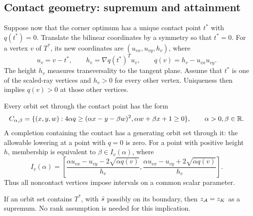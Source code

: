 \subsection{Contact geometry: supremum and attainment}

Suppose now that the corner optimum has a unique contact point $t^*$ with
$q(t^*)=0$. Translate the bilinear coordinates by a symmetry so that
$t^*=0$. For a vertex $v$ of $T^*$, its new coordinates are
$(u_{vx},u_{vy},h_v)$, where
\[
 u_v=v-t^*,\qquad h_v=\nabla q(t^*)^Tu_v,
 \qquad q(v)=h_v-u_{vx}u_{vy}.
\]
The height $h_v$ measures transversality to the tangent plane. Assume that
$t^*$ is one of the scaled-ray vertices and $h_v>0$ for every other vertex.
Uniqueness then implies $q(v)>0$ at those other vertices.

Every orbit set through the contact point has the form
\begin{equation}\label{dp:contact-set}
 C_{\alpha,\beta}=
 \{(x,y,w):4\alpha q\ge(\alpha x-y-\beta w)^2,
                 \alpha w+\beta x+1\ge0\},\qquad \alpha>0, \beta\in\mathbb R.
\end{equation}
A completion containing the contact has a generating orbit set through it:
the allowable lowering at a point with $q=0$ is zero.
For a point with positive height $h$, membership is equivalent to
$\beta\in I_v(\alpha)$, where
\begin{equation}\label{dp:interval}
 I_v(\alpha)=
 \left[\frac{\alpha u_{vx}-u_{vy}-2\sqrt{\alpha q(v)}}{h_v},
       \frac{\alpha u_{vx}-u_{vy}+2\sqrt{\alpha q(v)}}{h_v}\right].
\end{equation}
Thus all noncontact vertices impose intervals on a common scalar parameter.

\begin{lemma}\label{dp:contact-approx}
If an orbit set contains $T^*$, with $\bar s$ possibly on its boundary, then
$z_{\mathcal A}=z_K$ as a supremum. No rank assumption is needed for this implication.
\end{lemma}

